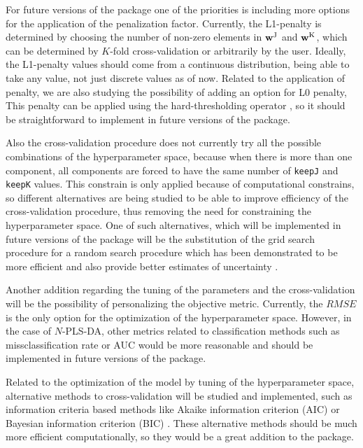 For future versions of the package one of the priorities is including more options for the application of the penalization factor. Currently, the L1-penalty is determined by choosing the number of non-zero elements in $\textbf{\text{w}}^\text{J}$ and $\textbf{\text{w}}^\text{K}$, which can be determined by $K$-fold cross-validation or arbitrarily by the user. Ideally, the L1-penalty values should come from a continuous distribution, being able to take any value, not just discrete values as of now. Related to the application of penalty, we are also studying the possibility of adding an option for L0 penalty, This penalty can be applied using the hard-thresholding operator \parencite{zou2006adaptive}, so it should be straightforward to implement in future versions of the package.

Also the cross-validation procedure does not currently try all the possible combinations of the hyperparameter space, because when there is more than one component, all components are forced to have the same number of \texttt{keepJ} and \texttt{keepK} values. This constrain is only applied because of computational constrains, so different alternatives are being studied to be able to improve efficiency of the cross-validation procedure, thus removing the need for constraining the hyperparameter space. One of such alternatives, which will be implemented in future versions of the package will be the substitution of the grid search procedure for a random search procedure which has been demonstrated to be more efficient and also provide better estimates of uncertainty \parencite{bergstra2012random}.

Another addition regarding the tuning of the parameters and the cross-validation will be the possibility of personalizing the objective metric. Currently, the $RMSE$ is the only option for the optimization of the hyperparameter space. However, in the case of $N$-PLS-DA, other metrics related to classification methods such as missclassification rate or AUC \parencite{bradley1997use} would be more reasonable and should be implemented in future versions of the package.

Related to the optimization of the model by tuning of the hyperparameter space, alternative methods to cross-validation will be studied and implemented, such as information criteria based methods like Akaike information criterion (AIC) \parencite{akaike1974new} or Bayesian information criterion (BIC) \parencite{schwarz1978estimating}. These alternative methods should be much more efficient computationally, so they would be a great addition to the package.

